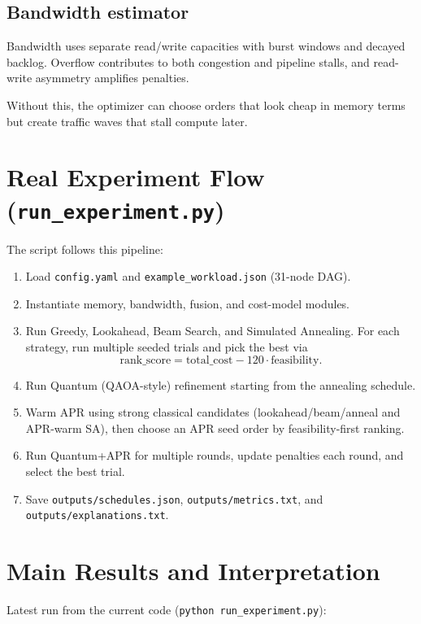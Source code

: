 \documentclass[11pt]{article}
\begin{document}
\subsection*{Bandwidth estimator}
Bandwidth uses separate read/write capacities with burst windows and decayed backlog. Overflow contributes to both congestion and pipeline stalls, and read-write asymmetry amplifies penalties.

Without this, the optimizer can choose orders that look cheap in memory terms but create traffic waves that stall compute later.

\section{Real Experiment Flow (\texttt{run\_experiment.py})}
The script follows this pipeline:
\begin{enumerate}
    \item Load \texttt{config.yaml} and \texttt{example\_workload.json} (31-node DAG).
    \item Instantiate memory, bandwidth, fusion, and cost-model modules.
    \item Run Greedy, Lookahead, Beam Search, and Simulated Annealing. For each strategy, run multiple seeded trials and pick the best via
    \[
    \text{rank\_score} = \text{total\_cost} - 120 \cdot \text{feasibility}.
    \]
    \item Run Quantum (QAOA-style) refinement starting from the annealing schedule.
    \item Warm APR using strong classical candidates (lookahead/beam/anneal and APR-warm SA), then choose an APR seed order by feasibility-first ranking.
    \item Run Quantum+APR for multiple rounds, update penalties each round, and select the best trial.
    \item Save \texttt{outputs/schedules.json}, \texttt{outputs/metrics.txt}, and \texttt{outputs/explanations.txt}.
\end{enumerate}

\section{Main Results and Interpretation}
Latest run from the current code (\texttt{python run\_experiment.py}):
\end{document}
